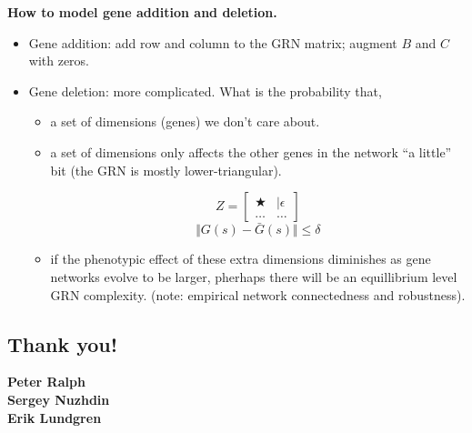 \documentclass{seminar}
\begin{document}
  \begin{slide}
    \textbf{How to model gene addition and deletion.}
      \begin{itemize}
        \item Gene addition: add row and column to the GRN matrix; augment $B$ and $C$ with zeros. 
        \item Gene deletion: more complicated. What is the probability that, 
          \begin{itemize}
            \item a set of dimensions (genes) we don't care about. 
            \item a set of dimensions only affects the other genes in the network ``a little'' bit (the GRN is mostly lower-triangular).
              \begin{multicols}{2} \begin{equation*}
                Z = \begin{bmatrix} \bigstar &\vert \epsilon \\ \hdots & \hdots \end{bmatrix}
              \end{equation*}
              \begin{equation*}
                \Vert G(s) - \bar{G}(s) \Vert \leq \delta
              \end{equation*}
          \end{multicols}
        \item if the phenotypic effect of these extra dimensions diminishes as gene networks evolve to be larger, pherhaps there will be an equillibrium level GRN complexity. (note: empirical network connectedness and robustness). 
          \end{itemize}
      \end{itemize}
  \end{slide}
  \begin{slide}
    \section*{Thank you!}
    \textbf{Peter Ralph \\ Sergey Nuzhdin \\ Erik Lundgren}
  \end{slide}
\end{document}
